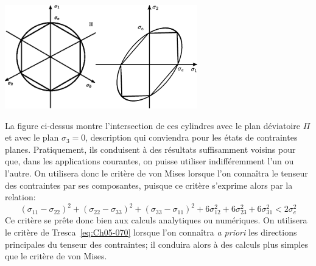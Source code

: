 \begin{center}
    \includegraphics[height=4.5cm]{../images/T1_Ch05-06a}\qquad  \includegraphics[height=4.5cm]{../images/T1_Ch05-06b}
\end{center}
La figure ci-dessus montre l'intersection de ces cylindres avec le plan déviatoire $\Pi$ et avec le plan $\sigma_3=0$, description qui conviendra pour les états de contraintes planes.
Pratiquement, ils conduisent à des résultats suffisamment voisins pour que, dans les applications courantes, on puisse utiliser indifféremment l'un ou l'autre.
On utilisera donc le critère de von Mises lorsque l'on connaîtra le tenseur des contraintes par ses composantes, puisque ce critère s'exprime alors par la relation: 
\begin{equation}
    \left( \sigma_{11} - \sigma_{22} \right)^2 + \left( \sigma_{22} - \sigma_{33} \right)^2 + \left( \sigma_{33} - \sigma_{11} \right)^2 + 6\sigma_{12}^2 + 6 \sigma_{23}^2 + 6\sigma_{31}^2 < 2 \sigma_e^2
    \label{eq:Ch05-072}
\end{equation}
Ce critère se prête donc bien aux calculs analytiques ou numériques.
On utilisera le critère de Tresca~\eqref{eq:Ch05-070} lorsque l'on connaîtra \emph{a priori} les directions principales du tenseur des contraintes; il conduira alors à des calculs plus simples que le critère de von Mises. 
